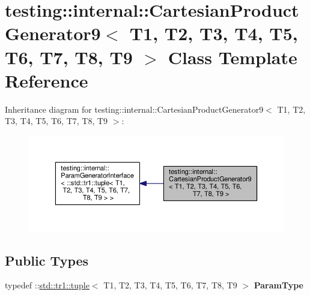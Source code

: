 \hypertarget{classtesting_1_1internal_1_1_cartesian_product_generator9}{}\section{testing\+:\+:internal\+:\+:Cartesian\+Product\+Generator9$<$ T1, T2, T3, T4, T5, T6, T7, T8, T9 $>$ Class Template Reference}
\label{classtesting_1_1internal_1_1_cartesian_product_generator9}


Inheritance diagram for testing\+:\+:internal\+:\+:Cartesian\+Product\+Generator9$<$ T1, T2, T3, T4, T5, T6, T7, T8, T9 $>$\+:
\nopagebreak
\begin{figure}[H]
\begin{center}
\leavevmode
\includegraphics[width=350pt]{classtesting_1_1internal_1_1_cartesian_product_generator9__inherit__graph}
\end{center}
\end{figure}
\subsection*{Public Types}
\begin{DoxyCompactItemize}
\item 
\mbox{\label{classtesting_1_1internal_1_1_cartesian_product_generator9_a333de873be0c11965024ad94d5e958d9}} 
typedef \+::\mbox{\hyperlink{classstd_1_1tr1_1_1tuple}{std\+::tr1\+::tuple}}$<$ T1, T2, T3, T4, T5, T6, T7, T8, T9 $>$ {\bfseries Param\+Type}
\end{DoxyCompactItemize}
